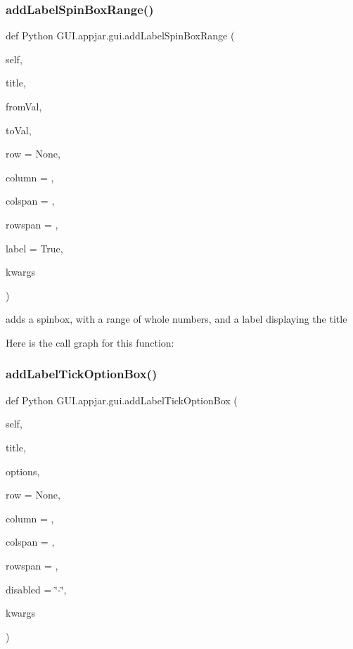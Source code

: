 \subsubsection{\texorpdfstring{add\+Label\+Spin\+Box\+Range()}{addLabelSpinBoxRange()}}
{\footnotesize\ttfamily def Python G\+U\+I.\+appjar.\+gui.\+add\+Label\+Spin\+Box\+Range (\begin{DoxyParamCaption}\item[{}]{self,  }\item[{}]{title,  }\item[{}]{from\+Val,  }\item[{}]{to\+Val,  }\item[{}]{row = {\ttfamily None},  }\item[{}]{column = {},  }\item[{}]{colspan = {},  }\item[{}]{rowspan = {},  }\item[{}]{label = {\ttfamily True},  }\item[{}]{kwargs }\end{DoxyParamCaption})}

\begin{DoxyVerb}adds a spinbox, with a range of whole numbers, and a label displaying the title \end{DoxyVerb}
 Here is the call graph for this function\+:
\mbox{\label{class_python_01_g_u_i_1_1appjar_1_1gui_a65a800d7e00e321b33ebcd27d000fb3d}} 
\subsubsection{\texorpdfstring{add\+Label\+Tick\+Option\+Box()}{addLabelTickOptionBox()}}
{\footnotesize\ttfamily def Python G\+U\+I.\+appjar.\+gui.\+add\+Label\+Tick\+Option\+Box (\begin{DoxyParamCaption}\item[{}]{self,  }\item[{}]{title,  }\item[{}]{options,  }\item[{}]{row = {\ttfamily None},  }\item[{}]{column = {},  }\item[{}]{colspan = {},  }\item[{}]{rowspan = {},  }\item[{}]{disabled = {\ttfamily \char`\"{}-\/\char`\"{}},  }\item[{}]{kwargs }\end{DoxyParamCaption})}

